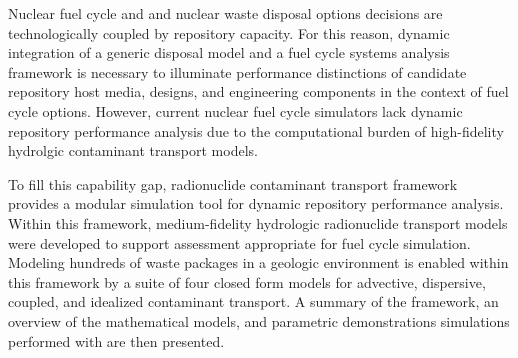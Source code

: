 

Nuclear fuel cycle and and nuclear waste disposal options decisions are
technologically coupled by repository capacity.  For this reason, dynamic
integration of a generic disposal model and a fuel cycle systems analysis
framework is necessary to illuminate performance distinctions of candidate
repository host media, designs, and engineering components in the context of
fuel cycle options. However, current nuclear fuel cycle simulators lack dynamic
repository performance analysis due to the computational burden of
high-fidelity hydrolgic contaminant transport models.

To fill this capability gap, \Cyder radionuclide contaminant transport
framework provides a modular simulation tool for dynamic repository performance
analysis.  Within this framework, medium-fidelity hydrologic radionuclide
transport models were developed to support assessment appropriate for fuel
cycle simulation.  Modeling hundreds of waste packages in a geologic
environment is enabled within this framework by a suite of four closed form
models for advective, dispersive, coupled, and idealized contaminant transport.
A summary of the framework, an overview of the mathematical models, and
parametric demonstrations simulations performed with \Cyder are then
presented.
